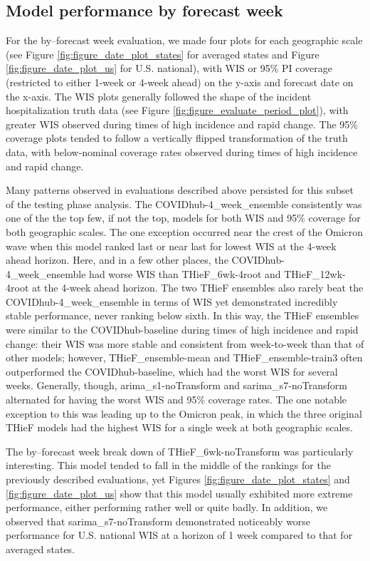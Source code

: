 \documentclass[thesis]{umassthesis}  %
\begin{document}
\subsection{Model performance by forecast week} \label{testing_forecast_week}
For the by--forecast week evaluation, we made four plots for each geographic scale (see Figure \ref{fig:figure_date_plot_states} for averaged states and Figure \ref{fig:figure_date_plot_us} for U.S. national), with WIS or 95\% PI coverage (restricted to either 1-week or 4-week ahead) on the y-axis and forecast date on the x-axis. The WIS plots generally followed the shape of the incident hospitalization truth data (see Figure \ref{fig:figure_evaluate_period_plot}), with greater WIS observed during times of high incidence and rapid change. The 95\% coverage plots tended to follow a vertically flipped transformation of the truth data, with below-nominal coverage rates observed during times of high incidence and rapid change.

Many patterns observed in evaluations described above persisted for this subset of the testing phase analysis. The COVIDhub-4\_week\_ensemble consistently was one of the the top few, if not the top, models for both WIS and 95\% coverage for both geographic scales. The one exception occurred near the crest of the Omicron wave when this model ranked last or near last for lowest WIS at the 4-week ahead horizon. Here, and in a few other places, the COVIDhub-4\_week\_ensemble had worse WIS than THieF\_6wk-4root and THieF\_12wk-4root at the 4-week ahead horizon. The two THieF ensembles also rarely beat the COVIDhub-4\_week\_ensemble in terms of WIS yet demonstrated incredibly stable performance, never ranking below sixth. In this way, the THieF ensembles were similar to the COVIDhub-baseline during times of high incidence and rapid change: their WIS was more stable and consistent from week-to-week than that of other models; however, THieF\_ensemble-mean and THieF\_ensemble-train3 often outperformed the COVIDhub-baseline, which had the worst WIS for several weeks. Generally, though, arima\_s1-noTransform and sarima\_s7-noTransform alternated for having the worst WIS and 95\% coverage rates. The one notable exception to this was leading up to the Omicron peak, in which the three original THieF models had the highest WIS for a single week at both geographic scales.

The by--forecast week break down of THieF\_6wk-noTransform was particularly interesting. This model tended to fall in the middle of the rankings for the previously described evaluations, yet Figures \ref{fig:figure_date_plot_states} and \ref{fig:figure_date_plot_us} show that this model usually exhibited more extreme performance, either performing rather well or quite badly. In addition, we observed that sarima\_s7-noTransform demonstrated noticeably worse performance for U.S. national WIS at a horizon of 1 week compared to that for averaged states.
\end{document}
